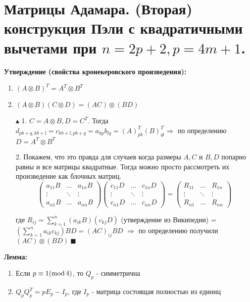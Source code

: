 \setcounter{section}{54}
\section{Матрицы Адамара. (Вторая) конструкция Пэли с квадратичными вычетами при $n = 2p + 2,p = 4m + 1$.}
\par \textbf{Утверждение (свойства кронекеровского произведения):} \begin{enumerate}
    \item $(A \otimes B)^T=A^T \otimes B^T$
    \item $(A \otimes B)(C \otimes D)=(AC) \otimes (BD)$
\end{enumerate}
\par \begin{itemize}
    \item[$\blacktriangle$ 1.] $C=A \otimes B, D = C^T$. Тогда $d_{pb+q, kb+l}=c_{kb+l, pb+q}=a_{kp} b_{lq}=(A)^T_{pk} (B)^T_{ql} \Rightarrow$ по определению $D = A^T \otimes B^T$
    \item[2.] Покажем, что это правда для случаев когда размеры $A , C$ и $B, D$ попарно равны и все матрицы квадратные. Тогда можно просто рассмотреть их произведение как блочных матриц.
    $$\left(
\begin{array}{ccc}
a_{11}B & \ldots & a_{1n}B\\
\vdots & \ddots & \vdots\\
a_{n1}B & \ldots & a_{nn}B
\end{array}
\right) \left(
\begin{array}{ccc}
c_{11}D & \ldots & c_{1n}D\\
\vdots & \ddots & \vdots\\
c_{n1}D & \ldots & c_{nn}D
\end{array}
\right)=\left(
\begin{array}{ccc}
R_{11} & \ldots & R_{1n}\\
\vdots & \ddots & \vdots\\
R_{n1} & \ldots & R_{nn}
\end{array}
\right)$$
\par где $R_{ij}=\sum_{k=1}^n (a_{ik} B)(c_{kj} D)$ (утверждение из Википедии) = $(\sum_{k=1}^n a_{ik} c_{kj})BD=(AC)_{ij} BD$ $\Rightarrow$ по определению получили $(AC) \otimes (BD) \: \blacksquare$
\end{itemize}
\par \textbf{Лемма:} \begin{enumerate}
    \item Если $p \equiv 1 (\operatorname{mod} 4)$, то $Q_p$ - симметрична
    \item $Q_pQ_p^T=pE_p-I_p$, где $I_p$ - матрица состоящая полностью из единиц
\end{enumerate} 
